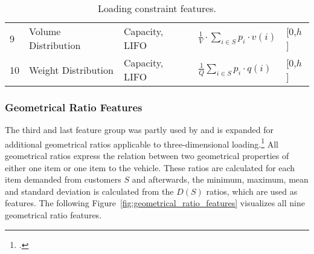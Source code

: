 \begin{table}[!ht]
\begin{tabular}{@{}P{0.08\textwidth}P{0.16\textwidth}P{0.26\textwidth}P{0.28\textwidth}@{}P{0.1\textwidth}@{}}
		9  & Volume Distribution                                                                              & Capacity, \gls{LIFO}   & $\displaystyle\frac{1}{V}\cdot\sum_{i \in S}p_i \cdot v(i)$                                           & [0,$h$] \\
		10 & Weight Distribution                                                                              & Capacity, \gls{LIFO}   & $\displaystyle\frac{1}{Q}\sum_{i \in S}p_i \cdot q(i)$                                                & [0,$h$] \\
		\bottomrule
	\end{tabular}
	\caption{Loading constraint features.}
	\label{tab:loading_constraints_features}
\end{table}


\subsubsection{Geometrical Ratio Features}
The third and last feature group
was partly used by \cite{zhang_learning-based_2022} and is expanded for additional geometrical ratios applicable to three-dimensional loading.\footcite[cf.][p. 14]{zhang_learning-based_2022}
All geometrical ratios express the relation between two geometrical properties of either one item or one item to the vehicle. These ratios
are calculated for each item demanded from customers $S$ and afterwards, the minimum, maximum, mean and standard deviation is calculated
from the $D(S)$ ratios, which are used as features. The following Figure~\ref{fig:geometrical_ratio_features} visualizes all nine geometrical ratio features.


